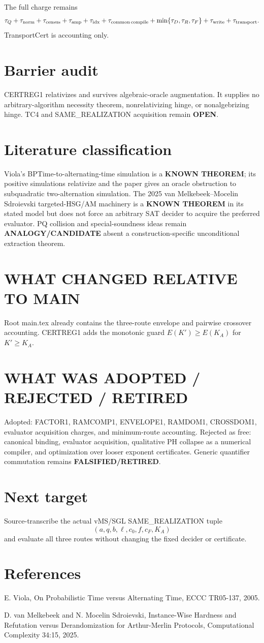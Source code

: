 \documentclass[11pt]{article}
\begin{document}
The full charge remains
\[
\tau_Q+\tau_{\rm norm}+\tau_{\rm census}+\tau_{\rm amp}+\tau_{\rm idx}
+\tau_{\rm common\,compile}+\min\{\tau_D,\tau_R,\tau_F\}
+\tau_{\rm write}+\tau_{\rm transport}.
\]
TransportCert is accounting only.

\section*{Barrier audit}
CERTREG1 relativizes and survives algebraic-oracle augmentation. It supplies no arbitrary-algorithm necessity theorem, nonrelativizing hinge, or nonalgebrizing hinge. TC4 and SAME\_REALIZATION acquisition remain \textbf{OPEN}.

\section*{Literature classification}
Viola's BPTime-to-alternating-time simulation is a \textbf{KNOWN THEOREM}; its positive simulations relativize and the paper gives an oracle obstruction to subquadratic two-alternation simulation. The 2025 van Melkebeek--Mocelin Sdroievski targeted-HSG/AM machinery is a \textbf{KNOWN THEOREM} in its stated model but does not force an arbitrary SAT decider to acquire the preferred evaluator. PQ collision and special-soundness ideas remain \textbf{ANALOGY/CANDIDATE} absent a construction-specific unconditional extraction theorem.

\section*{WHAT CHANGED RELATIVE TO MAIN}
Root main.tex already contains the three-route envelope and pairwise crossover accounting. CERTREG1 adds the monotonic guard \(E(K')\ge E(K_A)\) for \(K'\ge K_A\).

\section*{WHAT WAS ADOPTED / REJECTED / RETIRED}
Adopted: FACTOR1, RAMCOMP1, ENVELOPE1, RAMDOM1, CROSSDOM1, evaluator acquisition charges, and minimum-route accounting. Rejected as free: canonical binding, evaluator acquisition, qualitative PH collapse as a numerical compiler, and optimization over looser exponent certificates. Generic quantifier commutation remains \textbf{FALSIFIED/RETIRED}.

\section*{Next target}
Source-transcribe the actual vMS/SGL SAME\_REALIZATION tuple
\[
(a,q,b,\ell,c_0,f,c_F,K_A)
\]
and evaluate all three routes without changing the fixed decider or certificate.

\section*{References}
E. Viola, On Probabilistic Time versus Alternating Time, ECCC TR05-137, 2005.

D. van Melkebeek and N. Mocelin Sdroievski, Instance-Wise Hardness and Refutation versus Derandomization for Arthur-Merlin Protocols, Computational Complexity 34:15, 2025.
\end{document}
